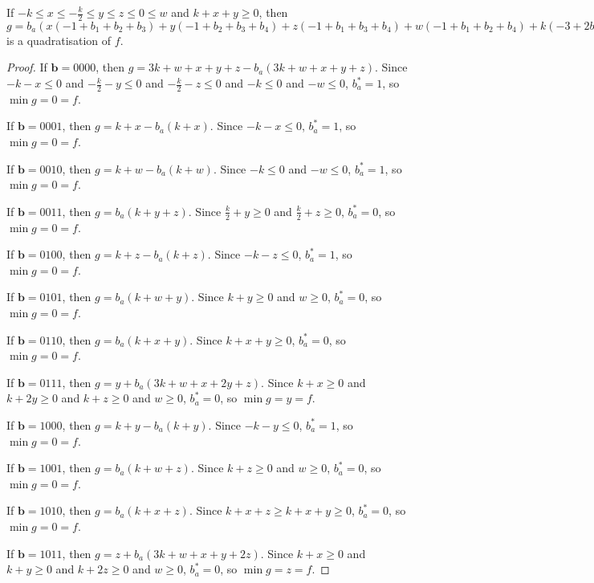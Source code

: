 \documentclass[11pt]{scrartcl}
\newcommand{\vc}[1]{\boldsymbol{#1}}
\begin{document}
\begin{lemma}
	\label{case5}
 If $-k\le x \le -\frac{k}{2} \le y \le z \le 0 \le w$ and $k + x+ y \ge 0$, then $g = b_a(x(-1+b_1+b_2+b_3)+y(-1+b_2+b_3+b_4)+z(-1+b_1+b_3+b_4)+w(-1+b_1+b_2+b_4)+k(-3+2b_1+2b_2+2b_3+2b_4))+x(+1 -b_1-b_2-b_3+b_1b_2+b_1b_3+b_2b_3)+y(+1 -b_2-b_3-b_4+b_2b_3+b_2b_4+b_3b_4)+z(+1 -b_1-b_3-b_4+b_1b_3+b_1b_4+b_3b_4)+w(+1 -b_1-b_2-b_4+b_1b_2+b_1b_4+b_2b_4)+k(+3 -2 b_1-2 b_2-2 b_3-2 b_4+b_1b_2+b_1b_3+b_1b_4+b_2b_3+b_2b_4+b_3b_4)$
 is a quadratisation of $f$.
 \end{lemma}

\begin{proof}
If $\vc b = 0000$, then $g = 3k + w + x + y + z - b_a(3k + w + x + y + z)$.
Since $-k - x \le 0$ and $-\frac{k}{2} - y \le 0$ and $-\frac{k}{2} - z \le 0$ and $-k \le 0$ and $-w \le 0$,
$b_a^* = 1$, so $\min g = 0 = f$.

If $\vc b = 0001$, then $g = k + x - b_a(k + x)$.
Since $-k - x \le 0$, $b_a^* = 1$, so $\min g = 0 = f$.

If $\vc b = 0010$, then $g = k + w - b_a(k + w)$.
Since $-k \le 0$ and $-w \le 0$, $b_a^* = 1$, so $\min g = 0 = f$.

If $\vc b = 0011$, then $g = b_a(k + y + z)$.
Since  $\frac{k}{2} + y \ge 0$ and $\frac{k}{2} + z \ge 0$, $b_a^* = 0$, so $\min g = 0 = f$. 

If $\vc b = 0100$, then $g = k + z - b_a(k + z)$.
Since $-k - z \le 0$, $b_a^* = 1$, so $\min g = 0 = f$.

If $\vc b = 0101$, then $g = b_a(k + w + y)$.
Since $k + y \ge 0$ and $w \ge 0$, $b_a^* = 0$, so $\min g = 0 = f$.

If $\vc b = 0110$, then $g = b_a(k + x + y)$.
Since $k + x + y \ge 0$, $b_a^* = 0$, so $\min g = 0 = f$.

If $\vc b = 0111$, then $g = y + b_a(3k + w + x + 2y + z)$.
Since $k + x \ge 0 $ and $k + 2y \ge 0 $ and $k + z \ge 0$ and $w \ge 0 $, $b_a^* = 0$, so $\min g = y = f$.

If $\vc b = 1000$, then $g = k + y - b_a(k + y)$.
Since $-k - y \le 0$, $b_a^* = 1$, so $\min g = 0 = f$.

If $\vc b = 1001$, then $g = b_a(k + w + z)$.
Since $k + z \ge 0$ and $w \ge 0$, $b_a^* = 0$, so $\min g = 0 = f$.

If $\vc b = 1010$, then $g = b_a(k + x + z)$.
Since $k + x + z \ge k + x + y \ge 0$, $b_a^* = 0$, so $\min g = 0 = f$.

If $\vc b = 1011$, then $g = z + b_a(3k + w + x + y + 2z)$.
Since $k + x \ge 0 $ and $k + y \ge 0$ and $k + 2z \ge 0$ and $w \ge 0$, $b_a^* = 0$, so $\min g = z = f$.


\end{proof}
\end{document}
